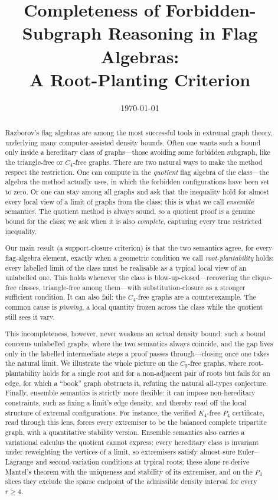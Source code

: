 \documentclass[11pt]{article}
\title{Completeness of Forbidden-Subgraph Reasoning in Flag Algebras:\\
       A Root-Planting Criterion}
\author{}
\date{\today}
\theoremstyle{definition}
\begin{document}
\maketitle

\begin{abstract}
Razborov's flag algebras are among the most successful tools in extremal graph theory,
underlying many computer-assisted density bounds. Often one wants such a bound only inside a hereditary
class of graphs---those avoiding some forbidden subgraph, like the triangle-free or
$C_4$-free graphs.  There are two natural ways to make the method respect the restriction.
One can compute in the \emph{quotient} flag algebra of the class---the algebra the method
actually uses, in which the forbidden configurations have been set to zero.  Or one can
stay among all graphs and ask that the inequality hold for almost every local view of a
limit of graphs from the class: this is what we call \emph{ensemble} semantics.  The
quotient method is always sound, so a quotient proof is a genuine bound for the class; we
ask when it is also \emph{complete}, capturing every true restricted inequality.

Our main result (a support-closure criterion) is that the two semantics agree, for every
flag-algebra element, exactly when a geometric condition we call \emph{root-plantability}
holds: every labelled limit of the class must be realisable as a typical local view of an
unlabelled one.  This holds whenever the class is blow-up-closed---recovering the
clique-free classes, triangle-free among them---with substitution-closure as a stronger sufficient
condition.  It can also fail: the $C_4$-free graphs are a counterexample.  The common
cause is \emph{pinning}, a local quantity frozen across the class while the quotient
still sees it vary.

This incompleteness, however, never weakens an actual density bound: such a bound concerns
unlabelled graphs, where the two semantics always coincide, and the gap lives only in the
labelled intermediate steps a proof passes through---closing once one takes the natural
limit.  We illustrate the whole picture on the $C_5$-free graphs, where root-plantability
holds for a single root and for a non-adjacent pair of roots but fails for an edge, for
which a ``book'' graph obstructs it, refuting the natural all-types conjecture.  Finally,
ensemble semantics is strictly more flexible: it can impose non-hereditary constraints,
such as fixing a limit's edge density, and thereby read off the local structure of
extremal configurations.  For instance, the verified $K_4$-free $P_4$ certificate, read
through this lens, forces every extremiser to be the balanced complete tripartite graph,
with a quantitative stability version.  Ensemble semantics also carries a variational
calculus the quotient cannot express: every hereditary class is invariant under
reweighting the vertices of a limit, so extremisers satisfy almost-sure Euler--Lagrange
and second-variation conditions at typical roots; these alone re-derive Mantel's
theorem with the uniqueness and stability of its extremiser, and on the $P_4$ slices
they exclude the sparse endpoint of the admissible density interval for every
$r\ge4$.
\end{abstract}
\end{document}
